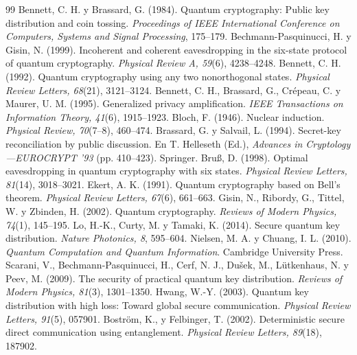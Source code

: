 \begin{thebibliography}{99}
 Bennett, C. H. y Brassard, G. (1984). Quantum cryptography: Public key distribution and coin tossing. \emph{Proceedings of IEEE International Conference on Computers, Systems and Signal Processing}, 175--179.
 Bechmann-Pasquinucci, H. y Gisin, N. (1999). Incoherent and coherent eavesdropping in the six-state protocol of quantum cryptography. \emph{Physical Review A, 59}(6), 4238--4248.
 Bennett, C. H. (1992). Quantum cryptography using any two nonorthogonal states. \emph{Physical Review Letters, 68}(21), 3121--3124.
 Bennett, C. H., Brassard, G., Cr\'epeau, C. y Maurer, U. M. (1995). Generalized privacy amplification. \emph{IEEE Transactions on Information Theory, 41}(6), 1915--1923.
 Bloch, F. (1946). Nuclear induction. \emph{Physical Review, 70}(7--8), 460--474.
 Brassard, G. y Salvail, L. (1994). Secret-key reconciliation by public discussion. En T. Helleseth (Ed.), \emph{Advances in Cryptology---EUROCRYPT '93} (pp. 410--423). Springer.
 Bru\ss, D. (1998). Optimal eavesdropping in quantum cryptography with six states. \emph{Physical Review Letters, 81}(14), 3018--3021.
 Ekert, A. K. (1991). Quantum cryptography based on Bell's theorem. \emph{Physical Review Letters, 67}(6), 661--663.
 Gisin, N., Ribordy, G., Tittel, W. y Zbinden, H. (2002). Quantum cryptography. \emph{Reviews of Modern Physics, 74}(1), 145--195.
 Lo, H.-K., Curty, M. y Tamaki, K. (2014). Secure quantum key distribution. \emph{Nature Photonics, 8}, 595--604.
 Nielsen, M. A. y Chuang, I. L. (2010). \emph{Quantum Computation and Quantum Information}. Cambridge University Press.
 Scarani, V., Bechmann-Pasquinucci, H., Cerf, N. J., Dušek, M., Lütkenhaus, N. y Peev, M. (2009). The security of practical quantum key distribution. \emph{Reviews of Modern Physics, 81}(3), 1301--1350.
 Hwang, W.-Y. (2003). Quantum key distribution with high loss: Toward global secure communication. \emph{Physical Review Letters, 91}(5), 057901.
 Boström, K., y Felbinger, T. (2002). Deterministic secure direct communication using entanglement. \emph{Physical Review Letters, 89}(18), 187902.

\end{thebibliography}
